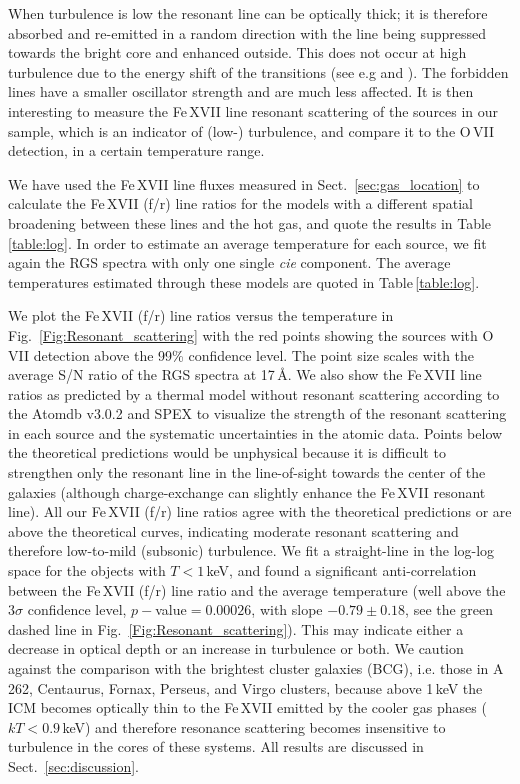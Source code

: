 \documentclass[useAMS,usenatbib]{mn2e}
\begin{document}
When turbulence is low the resonant line can be optically thick;  
it is therefore absorbed and re-emitted in a random direction with the line 
being suppressed towards the bright core and enhanced outside. 
This does not occur at high turbulence
due to the energy shift of the transitions
(see e.g \citealt{Werner2009} and \citealt{dePlaa2012}). 
The forbidden lines have a smaller oscillator strength and are much less affected.
It is then interesting to measure the Fe\,{\small XVII} line resonant scattering 
of the sources in our sample, which is an indicator of 
(low-) turbulence, and compare it to the O\,{\small VII} detection,
in a certain temperature range. 

We have used the Fe\,{\small XVII} line fluxes measured in Sect.~\ref{sec:gas_location}
to calculate the Fe\,{\small XVII} (f/r) line ratios for the models 
with a different spatial broadening between these lines and the hot gas,
and quote the results in Table\,\ref{table:log}.
In order to estimate an average temperature for each source, 
we fit again the RGS spectra with only one single \textit{cie} component.
The average temperatures estimated through these models are quoted in Table\,\ref{table:log}.

We plot the Fe\,{\small XVII} (f/r) line ratios versus the temperature 
in Fig.~\ref{Fig:Resonant_scattering} with the red points showing the sources 
with O\,{\small VII} detection above the 99\% confidence level.
The point size scales with the average S/N ratio of the RGS spectra at 17\,{\AA}.
We also show the Fe\,{\small XVII} line ratios as predicted by a thermal
model without resonant scattering according to the Atomdb v3.0.2 and SPEX
to visualize the strength of the resonant scattering in each source
and the systematic uncertainties in the atomic data.
Points below the theoretical predictions would be unphysical because
it is difficult to strengthen only the resonant line in the line-of-sight
towards the center of the galaxies (although charge-exchange can slightly enhance 
the Fe\,{\small XVII} resonant line). All our Fe\,{\small XVII} (f/r) line ratios
agree with the theoretical predictions or are above the theoretical curves,
indicating moderate resonant scattering and therefore low-to-mild (subsonic) turbulence.
We fit a straight-line in the log-log space for the objects with $T<1$\,keV, 
and found a significant anti-correlation between the Fe\,{\small XVII} (f/r) line ratio 
and the average temperature (well above the $3\sigma$ confidence level, 
$p-$value$=0.00026$, with slope $-0.79\pm0.18$, 
see the green dashed line in Fig.~\ref{Fig:Resonant_scattering}).
This may indicate either a decrease in optical depth or 
an increase in turbulence or both.
We caution against the comparison with the brightest cluster galaxies (BCG), 
i.e. those in A\,262, Centaurus, Fornax, Perseus, and Virgo clusters, 
because above 1\,keV the ICM becomes optically thin to the 
Fe\,{\small XVII} emitted by the cooler gas phases ($kT<0.9$\,keV)
and therefore resonance scattering becomes insensitive to turbulence 
in the cores of these systems.
All results are discussed in Sect.~\ref{sec:discussion}.
\end{document}
